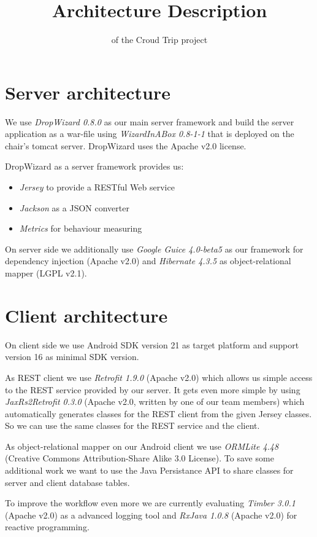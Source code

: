 \documentclass[ngerman, 10pt, a4paper]{scrartcl}
\title{ Architecture Description\huge \vspace{1pt} }
\author{ of the Croud Trip project\\ }
\makeatletter
\def\printtitle{ {\color{bl} \centering \huge \sc \textbf{\@title}\par}}
\def\printauthor{{\color{bl} \centering \small \@author}}
\makeatother
\begin{document}
\clearpage
\printtitle
\printauthor 

\section{Server architecture}
We use \emph{DropWizard 0.8.0} \cite{DropWizard} as our main server framework and build the server application as a war-file using \emph{WizardInABox 0.8-1-1} \cite{WizardInABox}  that is deployed on the chair's tomcat server. DropWizard uses the Apache v2.0 license.

DropWizard as a server framework provides us:
\begin{itemize}
\setlength\itemsep{0em}
\item \emph{Jersey} to provide a RESTful Web service
\item \emph{Jackson} as a JSON converter
\item \emph{Metrics} for behaviour measuring
\end{itemize} 
On server side we additionally use \emph{Google Guice 4.0-beta5} \cite{GGuice} as our framework for dependency injection (Apache v2.0) and \emph{Hibernate 4.3.5} \cite{Hibernate} as object-relational mapper (LGPL v2.1).

\section{Client architecture}
On client side we use Android SDK version 21 as target platform and support version 16 as minimal SDK version.

As REST client we use \emph{Retrofit 1.9.0} \cite{Retrofit} (Apache v2.0) which allows us simple access to the REST service provided by our server. It gets even more simple by using \emph{JaxRs2Retrofit 0.3.0} \cite{JRR} (Apache v2.0, written by one of our team members) which automatically generates classes for the REST client from the given Jersey classes. So we can use the same classes for the REST service and the client.

As object-relational mapper on our Android client we use \emph{ORMLite 4.48} \cite{ORMLite} (Creative Commons Attribution-Share Alike 3.0 License). To save some additional work we want to use the Java Persistance API to share classes for server and client database tables.

To improve the workflow even more we are currently evaluating \emph{Timber 3.0.1} \cite{Timber} (Apache v2.0) as a advanced logging tool and \emph{RxJava 1.0.8} \cite{RxJava} (Apache v2.0) for reactive programming.
\end{document}
